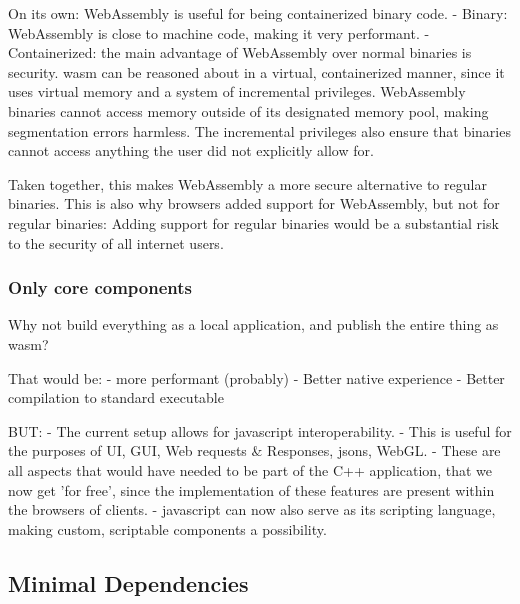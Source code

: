 On its own: WebAssembly is useful for being containerized binary code. 
- Binary: WebAssembly is close to machine code, making it very performant.
- Containerized: the main advantage of WebAssembly over normal binaries is security. wasm can be reasoned about in a virtual, containerized manner, since it uses virtual memory and a system of incremental privileges. WebAssembly binaries cannot access memory outside of its designated memory pool, making segmentation errors harmless. The incremental privileges also ensure that binaries cannot access anything the user did not explicitly allow for. 

Taken together, this makes WebAssembly a more secure alternative to regular binaries. This is also why browsers added support for WebAssembly, but not for regular binaries: Adding support for regular binaries would be a substantial risk to the security of all internet users.



\subsubsection*{Only core components}

Why not build everything as a local application, and publish the entire thing as wasm?

That would be:
- more performant (probably)
- Better native experience
- Better compilation to standard executable

BUT:
- The current setup allows for javascript interoperability. 
  - This is useful for the purposes of UI, GUI, Web requests \& Responses, jsons, WebGL.
  - These are all aspects that would have needed to be part of the C++ application, that we now get 'for free', since the implementation of these features are present within the browsers of clients. 
- javascript can now also serve as its scripting language, making custom, scriptable components a possibility.




\subsection{Minimal Dependencies}


